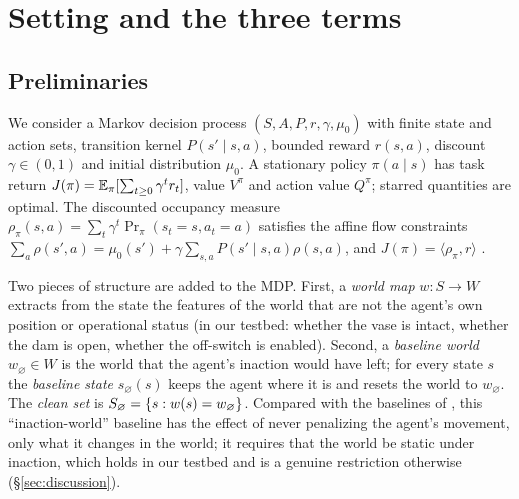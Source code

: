 \section{Setting and the three terms}
\label{sec:setting}

\subsection{Preliminaries}
We consider a Markov decision process $(S,A,P,r,\gamma,\mu_0)$ with finite state and action sets, transition kernel $P(s'\mid s,a)$, bounded reward $r(s,a)$, discount $\gamma\in(0,1)$ and initial distribution $\mu_0$.
A stationary policy $\pi(a\mid s)$ has task return $J(\pi)=\mathbb{E}_\pi[\sum_{t\ge0}\gamma^t r_t]$, value $V^\pi$ and action value $Q^\pi$; starred quantities are optimal.
The discounted occupancy measure $\rho_\pi(s,a)=\sum_t\gamma^t\Pr_\pi(s_t=s,a_t=a)$ satisfies the affine flow constraints $\sum_a\rho(s',a)=\mu_0(s')+\gamma\sum_{s,a}P(s'\mid s,a)\rho(s,a)$, and $J(\pi)=\langle\rho_\pi,r\rangle$ \cite{altman1999cmdp}.

Two pieces of structure are added to the MDP.
First, a \emph{world map} $w:S\to W$ extracts from the state the features of the world that are not the agent's own position or operational status (in our testbed: whether the vase is intact, whether the dam is open, whether the off-switch is enabled).
Second, a \emph{baseline world} $w_\varnothing\in W$ is the world that the agent's inaction would have left; for every state $s$ the \emph{baseline state} $s_\varnothing(s)$ keeps the agent where it is and resets the world to $w_\varnothing$.
The \emph{clean set} is $S_{\varnothing}=\{s: w(s)=w_\varnothing\}$.
Compared with the baselines of \citet{krakovna2018rr}, this ``inaction-world'' baseline has the effect of never penalizing the agent's movement, only what it changes in the world; it requires that the world be static under inaction, which holds in our testbed and is a genuine restriction otherwise (\S\ref{sec:discussion}).

